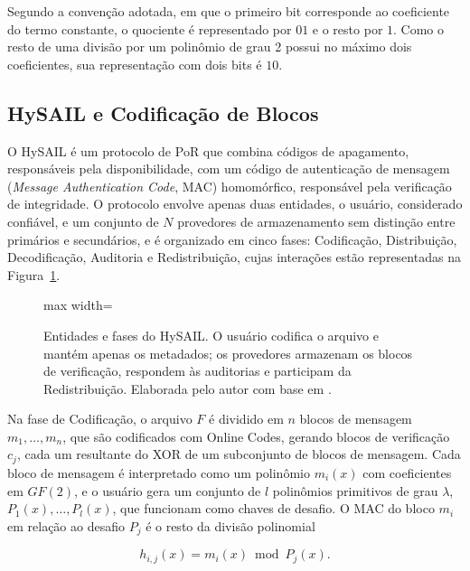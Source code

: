Segundo a convenção adotada, em que o primeiro bit corresponde ao coeficiente do termo constante, o quociente é representado por $01$ e o resto por $1$. Como o resto de uma divisão por um polinômio de grau 2 possui no máximo dois coeficientes, sua representação com dois bits é $10$.


\subsection{HySAIL e Codificação de Blocos}
O HySAIL \cite{amaral2013hysail,amaral2019hysail} é um protocolo de \acrshort{PoR} que combina códigos de apagamento, responsáveis pela disponibilidade, com um código de autenticação de mensagem (\emph{Message Authentication Code}, \acrshort{MAC}) homomórfico, responsável pela verificação de integridade. O protocolo envolve apenas duas entidades, o usuário, considerado confiável, e um conjunto de $N$ provedores de armazenamento sem distinção entre primários e secundários, e é organizado em cinco fases: Codificação, Distribuição, Decodificação, Auditoria e Redistribuição, cujas interações estão representadas na Figura~\ref{fig:hysail_protocolo}.

\begin{figure}[htbp]
	\centering
	\begin{adjustbox}{max width=\textwidth}
		
	\end{adjustbox}
	\caption{Entidades e fases do HySAIL. O usuário codifica o arquivo e mantém apenas os metadados; os provedores armazenam os blocos de verificação, respondem às auditorias e participam da Redistribuição. Elaborada pelo autor com base em \cite{amaral2019hysail}.}
	\label{fig:hysail_protocolo}
\end{figure}

Na fase de Codificação, o arquivo $F$ é dividido em $n$ blocos de mensagem $m_1, \ldots, m_n$, que são codificados com Online Codes, gerando blocos de verificação $c_j$, cada um resultante do XOR de um subconjunto de blocos de mensagem. Cada bloco de mensagem é interpretado como um polinômio $m_i(x)$ com coeficientes em $GF(2)$, e o usuário gera um conjunto de $l$ polinômios primitivos de grau $\lambda$, $P_1(x), \ldots, P_l(x)$, que funcionam como chaves de desafio. O \acrshort{MAC} do bloco $m_i$ em relação ao desafio $P_j$ é o resto da divisão polinomial

\begin{equation}
	h_{i,j}(x) = m_i(x) \bmod P_j(x).
	\label{eq:hysail_mac}
\end{equation}

